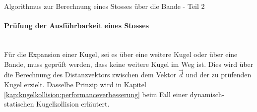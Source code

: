 \newpage
\begin{algorithm}[H]
    \DontPrintSemicolon
    \caption{Algorithmus zur Berechnung eines Stosses über die Bande - Teil 2}
    \label{alg:stoss_ueber_bande_2}
\end{algorithm}

\paragraph{Prüfung der Ausführbarkeit eines Stosses}\mbox{}\\

Für die Expansion einer Kugel, sei es über eine weitere Kugel oder über eine Bande,
muss geprüft werden, dass keine weitere Kugel im Weg ist. Dies wird über die Berechnung
des Distanzvektors zwischen dem Vektor $\vec{d}$ und der zu prüfenden Kugel erzielt. Dasselbe Prinzip wird
in Kapitel \ref{kap:kugelkollision:performanceverbesserung} beim Fall einer dynamisch-statischen Kugelkollision erläutert.

